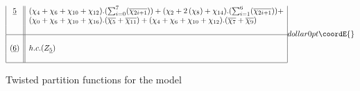\documentclass[a4paper,11pt]{article}
\providecommand{\ch}[1]{\chi_{#1}}
\providecommand{\och}[1]{\overline{\chi_{#1}}}
\providecommand{\ud}[1]{\underline{#1}}
\begin{document}
\begin{table}
$${\begin{array}{|c||l|}
\ud5  & (\ch{4} + \ch{6} + \ch{10} + \ch{12}).(\sum_{i=0}^{7}(\och{2i+1})) +
(\ch{2} + 2\, (\ch{8}) + \ch{14}).(\sum_{i=1}^{6}(\och{2i+1})) + \\
{}  & (\ch{0} + \ch{6} + \ch{10} + \ch{16}).(\och{5} + \och{11}) +
(\ch{4} + \ch{6} + \ch{10} + \ch{12}).(\och{7} + \och{9}) \\
{}  &  {}  \\
\hline
{}  &  {}  \\
(\ud6)  &  h.c.(Z_{\ud5}) \\
{}  &  {}  \\
\hline
\end{array}
}{dollar}{0pt}\coordE{}$$
\caption{Twisted partition functions for the \coordHE{} model}
\end{table}

\end{document}
